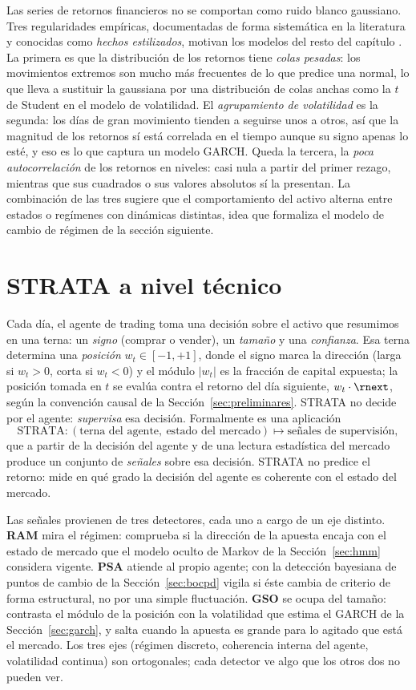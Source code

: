 Las series de retornos financieros no se comportan como ruido blanco gaussiano. Tres regularidades empíricas, documentadas de forma sistemática en la literatura y conocidas como \emph{hechos estilizados}, motivan los modelos del resto del capítulo \cite{engle1982}. La primera es que la distribución de los retornos tiene \emph{colas pesadas}: los movimientos extremos son mucho más frecuentes de lo que predice una normal, lo que lleva a sustituir la gaussiana por una distribución de colas anchas como la $t$ de Student en el modelo de volatilidad. El \emph{agrupamiento de volatilidad} es la segunda: los días de gran movimiento tienden a seguirse unos a otros, así que la magnitud de los retornos sí está correlada en el tiempo aunque su signo apenas lo esté, y eso es lo que captura un modelo GARCH. Queda la tercera, la \emph{poca autocorrelación} de los retornos en niveles: casi nula a partir del primer rezago, mientras que sus cuadrados o sus valores absolutos sí la presentan. La combinación de las tres sugiere que el comportamiento del activo alterna entre estados o regímenes con dinámicas distintas, idea que formaliza el modelo de cambio de régimen de la sección siguiente.

\section{STRATA a nivel técnico}
\label{sec:strata-tecnico}

Cada día, el agente de trading toma una decisión sobre el activo que resumimos en una terna: un \emph{signo} (comprar o vender), un \emph{tamaño} y una \emph{confianza}. Esa terna determina una \emph{posición} $w_t \in [-1, +1]$, donde el signo marca la dirección (larga si $w_t > 0$, corta si $w_t < 0$) y el módulo $|w_t|$ es la fracción de capital expuesta; la posición tomada en $t$ se evalúa contra el retorno del día siguiente, $w_t \cdot \rnext$, según la convención causal de la Sección~\ref{sec:preliminares}. STRATA no decide por el agente: \emph{supervisa} esa decisión. Formalmente es una aplicación
\[
\mathrm{STRATA}\colon (\text{terna del agente},\ \text{estado del mercado}) \longmapsto \text{señales de supervisión},
\]
que a partir de la decisión del agente y de una lectura estadística del mercado produce un conjunto de \emph{señales} sobre esa decisión. STRATA no predice el retorno: mide en qué grado la decisión del agente es coherente con el estado del mercado.

Las señales provienen de tres detectores, cada uno a cargo de un eje distinto. \textbf{RAM} mira el régimen: comprueba si la dirección de la apuesta encaja con el estado de mercado que el modelo oculto de Markov de la Sección~\ref{sec:hmm} considera vigente. \textbf{PSA} atiende al propio agente; con la detección bayesiana de puntos de cambio de la Sección~\ref{sec:bocpd} vigila si éste cambia de criterio de forma estructural, no por una simple fluctuación. \textbf{GSO} se ocupa del tamaño: contrasta el módulo de la posición con la volatilidad que estima el GARCH de la Sección~\ref{sec:garch}, y salta cuando la apuesta es grande para lo agitado que está el mercado. Los tres ejes (régimen discreto, coherencia interna del agente, volatilidad continua) son ortogonales; cada detector ve algo que los otros dos no pueden ver.

